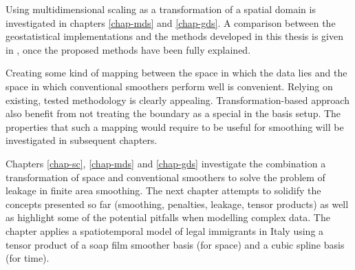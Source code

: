 
Using multidimensional scaling as a transformation of a spatial domain is investigated in chapters  \ref{chap-mds} and \ref{chap-gds}. A comparison between the geostatistical implementations and the methods developed in this thesis is given in , once the proposed methods have been fully explained.

Creating some kind of mapping between the space in which the data lies and the space in which conventional smoothers perform well is convenient. Relying on existing, tested methodology is clearly appealing. Transformation-based approach also benefit from not treating the boundary as a special in the basis setup. The properties that such a mapping would require to be useful for smoothing will be investigated in subsequent chapters.

Chapters \ref{chap-sc}, \ref{chap-mds} and \ref{chap-gds} investigate the combination a transformation of space and conventional smoothers to solve the problem of leakage in finite area smoothing. The next chapter attempts to solidify the concepts presented so far (smoothing, penalties, leakage, tensor products) as well as highlight some of the potential pitfalls when modelling complex data. The chapter applies a spatiotemporal model of legal immigrants in Italy using a tensor product of a soap film smoother basis (for space) and a cubic spline basis (for time).